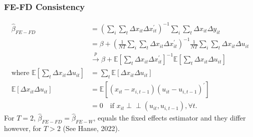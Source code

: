 \subsubsection{FE-FD Consistency}
\begin{align*}
    \hat{\beta}_{FE-FD} &= \left(\sum_i \sum_t \Delta x_{it} \Delta x_{it}^{\prime} \right)^{-1} \sum_i \sum_t \Delta x_{it} \Delta y_{it} \\
    &= \beta + \left(\frac{1}{NT} \sum_i \sum_t \Delta x_{it} \Delta x_{it}^{\prime} \right)^{-1} \frac{1}{NT} \sum_i \sum_t \Delta x_{it} \Delta u_{it} \\
    &\overset{p}{\rightarrow} \beta + \mathbb{E}\left[\sum_t \Delta x_{it} \Delta x_{it}^{\prime} \right]^{-1} \mathbb{E}\left[\sum_t \Delta x_{it} \Delta u_{it} \right] \\
    \text{where } \mathbb{E}\left[\sum_t \Delta x_{it} \Delta u_{it}\right] &= \sum_t \mathbb{E}\left[\Delta x_{it} \Delta u_{it} \right]\\
    \mathbb{E}\left[\Delta x_{it} \Delta u_{it} \right] &= \mathbb{E}\left[\left(x_{it} - x_{i, t-1} \right) \left(u_{it} - u_{i, t-1} \right)^{\prime} \right] \\
    &= 0 \quad \text{if } x_{it} \perp\!\!\!\perp (u_{it}, u_{i, t-1}), \forall t.
\end{align*}
For $T = 2$, $\hat{\beta}_{FE-FD} = \hat{\beta}_{FE-W}$, equals the fixed effects estimator and they differ however, for $T>2$ (See Hanse, 2022\cite{hansen2022econometrics}).

